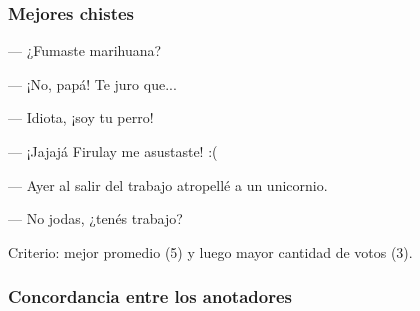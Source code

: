 \begin{frame}
    \frametitle{Mejores chistes}

    \begin{block}{}
        --- ¿Fumaste marihuana?

        --- ¡No, papá! Te juro que...

        --- Idiota, ¡soy tu perro!

        --- ¡Jajajá Firulay me asustaste! :(
    \end{block}{}

    \begin{block}{}
        --- Ayer al salir del trabajo atropellé a un unicornio.

        --- No jodas, ¿tenés trabajo?
    \end{block}{}

    Criterio: mejor promedio (5) y luego mayor cantidad de votos (3).
\end{frame}

\subsubsection{Concordancia entre los anotadores}


